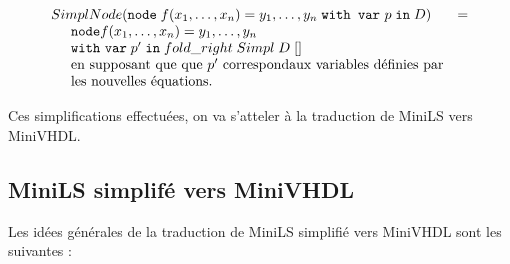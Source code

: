 \documentclass[a4paper]{article}
\newcommand{\mybox}[1]{\mbox{\tt{#1}}}
\newcommand{\ind}[0]{\hspace{0.5cm}}
\newcommand{\Node}[4]{\mybox{node} \; f(#1) = #2 \; \mybox{with var} \
  #3 \; \mybox{in} \; #4}
\begin{document}
\[
\begin{array}{ll}
  \simplnd{\Node{x_1,\dots,x_n}{y_1,\dots,y_n}{p}{D}} & = \\
  \ind \mathtt{node} f(x_1,\dots,x_n) = y_1, \dots, y_n \; \\
  \ind \mathtt{with} \  \mathtt{var} \; p' \; \mathtt{in} \; fold\_right \;Simpl
  \; D \; [] \\
  \ind \mbox{en supposant que que } p' \mbox{ correspond}
  \mbox{aux variables d\'efinies par} \\ \ind \mbox{les nouvelles \'equations.}
\end{array}
\]

Ces simplifications effectu\'ees, on va s'atteler \`a la traduction de MiniLS vers
MiniVHDL.

\subsection{MiniLS simplif\'e vers MiniVHDL}

Les id\'ees g\'en\'erales de la traduction de MiniLS simplifi\'e vers MiniVHDL sont les
suivantes :
\end{document}
